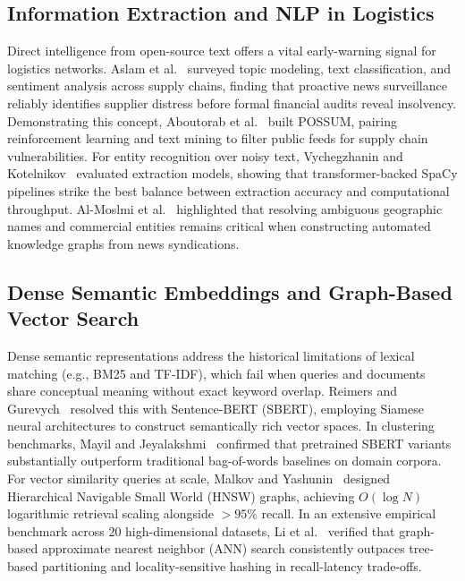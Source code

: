\documentclass[conference]{IEEEtran}
\begin{document}
\subsection{Information Extraction and NLP in Logistics}
Direct intelligence from open-source text offers a vital early-warning signal for logistics networks. Aslam et al.~\cite{aslam2023using} surveyed topic modeling, text classification, and sentiment analysis across supply chains, finding that proactive news surveillance reliably identifies supplier distress before formal financial audits reveal insolvency. Demonstrating this concept, Aboutorab et al.~\cite{aboutorab2023possum} built POSSUM, pairing reinforcement learning and text mining to filter public feeds for supply chain vulnerabilities. For entity recognition over noisy text, Vychegzhanin and Kotelnikov~\cite{vychegzhanin2019comparison} evaluated extraction models, showing that transformer-backed SpaCy pipelines strike the best balance between extraction accuracy and computational throughput. Al-Moslmi et al.~\cite{almoslmi2020named} highlighted that resolving ambiguous geographic names and commercial entities remains critical when constructing automated knowledge graphs from news syndications.

\subsection{Dense Semantic Embeddings and Graph-Based Vector Search}
Dense semantic representations address the historical limitations of lexical matching (e.g., BM25 and TF-IDF), which fail when queries and documents share conceptual meaning without exact keyword overlap. Reimers and Gurevych~\cite{reimers2019sentence} resolved this with Sentence-BERT (SBERT), employing Siamese neural architectures to construct semantically rich vector spaces. In clustering benchmarks, Mayil and Jeyalakshmi~\cite{mayil2023pretrained} confirmed that pretrained SBERT variants substantially outperform traditional bag-of-words baselines on domain corpora. For vector similarity queries at scale, Malkov and Yashunin~\cite{malkov2020efficient} designed Hierarchical Navigable Small World (HNSW) graphs, achieving $O(\log N)$ logarithmic retrieval scaling alongside $>95\%$ recall. In an extensive empirical benchmark across 20 high-dimensional datasets, Li et al.~\cite{li2020approximate} verified that graph-based approximate nearest neighbor (ANN) search consistently outpaces tree-based partitioning and locality-sensitive hashing in recall-latency trade-offs.
\end{document}
